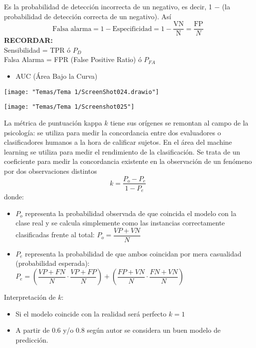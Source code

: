Es la probabilidad de detección incorrecta de un negativo, es decir, 1 $-$ (la probabilidad de detección correcta de un negativo). Así \[ \text{Falsa alarma}=1-\text{Especificidad}=1-\dfrac{\mathrm{VN}}{\mathrm{N}}=\dfrac{\mathrm{FP}}{N} \]
\textbf{RECORDAR:}\\
Sensibilidad = TPR ó $P_D$\\
Falsa Alarma = FPR (False Positive Ratio) ó $P_{FA}$
\begin{itemize}[label=\color{red}\textbullet, leftmargin=*]
	\item \color{lightblue}AUC (Área Bajo la Curva)
\end{itemize}
\begin{center}
	\texttt{[image: "Temas/Tema 1/ScreenShot024.drawio"]}
\end{center}
\begin{center}
	\texttt{[image: "Temas/Tema 1/Screenshot025"]}
\end{center}
La métrica de puntuación kappa $k$ tiene sus orígenes se remontan al campo de la psicología: se utiliza para medir la concordancia entre dos evaluadores o clasificadores humanos a la hora de calificar sujetos. En el área del machine learning se utiliza para medir el rendimiento de la clasificación. Se trata de un coeficiente para medir la concordancia existente en la observación de un fenómeno por dos observaciones distintos \[ k=\dfrac{P_o-P_e}{1-P_e} \]donde:
\begin{itemize}
	\item $P_o$ representa la probabilidad observada de que coincida el modelo con la clase real y se calcula simplemente como las instancias correctamente clasificadas frente al total: $P_o=\dfrac{VP+VN}{N}$
	\item $P_e$ representa la probabilidad de que ambos coincidan por mera casualidad (probabilidad esperada):\\ $P_e=\left(\dfrac{VP+FN}{N}\cdot\dfrac{VP+FP}{N}\right)+\left(\dfrac{FP+VN}{N}\cdot\dfrac{FN+VN}{N}\right)$
\end{itemize}
Interpretación de $k$:
\begin{itemize}
	\item Si el modelo coincide con la realidad será perfecto $k=1$
	\item A partir de 0.6 y/o 0.8 según autor se considera un buen modelo de predicción.
\end{itemize}
